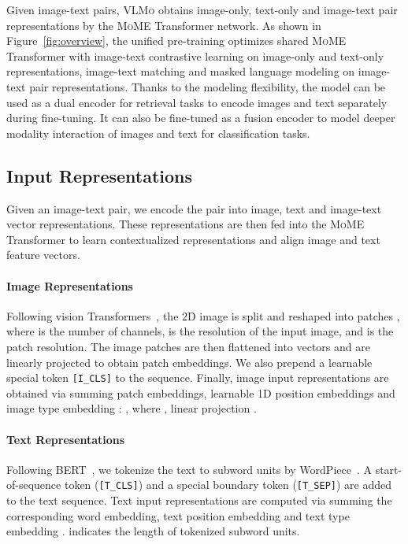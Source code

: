 \documentclass{article}
\newcommand{\sptk}[1]{\texttt{[#1]}}
\newcommand\our{\textsc{VLMo}}
\newcommand\mome{\textsc{MoME}}
\begin{document}
Given image-text pairs, \our{} obtains image-only, text-only and image-text pair representations by the \mome{} Transformer network.
As shown in Figure~\ref{fig:overview}, the unified pre-training optimizes shared \mome{} Transformer with image-text contrastive learning on image-only and text-only representations, image-text matching and masked language modeling on image-text pair representations.
Thanks to the modeling flexibility, the model can be used as a dual encoder for retrieval tasks to encode images and text separately during fine-tuning.
It can also be fine-tuned as a fusion encoder to model deeper modality interaction of images and text for classification tasks.


\subsection{Input Representations}
\label{sec:repr}

Given an image-text pair, we encode the pair into image, text and image-text vector representations.
These representations are then fed into the \mome{} Transformer to learn contextualized representations and align image and text feature vectors.

\paragraph{Image Representations} 
Following vision Transformers~\citep{vit,deit,beit}, the 2D image  is split and reshaped into  patches , where  is the number of channels,  is the resolution of the input image, and  is the patch resolution. 
The image patches are then flattened into vectors and are linearly projected to obtain patch embeddings.
We also prepend a learnable special token \sptk{I\_CLS} to the sequence.
Finally, image input representations are obtained via summing patch embeddings, learnable 1D position embeddings  and image type embedding : , 
where , linear projection .

\paragraph{Text Representations}
Following BERT~\citep{bert}, we tokenize the text to subword units by WordPiece~\citep{gnmt}. 
A start-of-sequence token (\sptk{T\_CLS}) and a special boundary token (\sptk{T\_SEP}) are added to the text sequence. 
Text input representations  are computed via summing the corresponding word embedding, text position embedding and text type embedding . 
 indicates the length of tokenized subword units.
\end{document}
